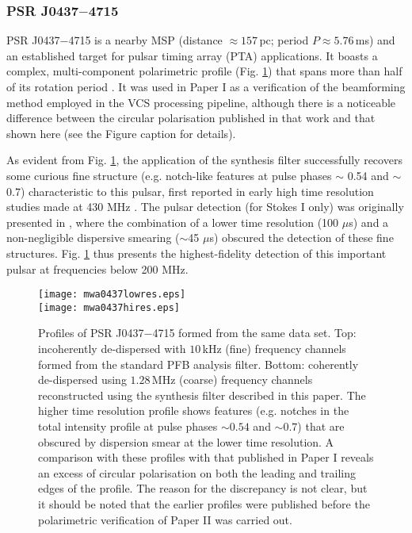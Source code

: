 \documentclass{pasa}%
\newcommand{\psrbhatJ}{J0437$-$4715}
\begin{document}
\subsubsection{PSR \psrbhatJ{}}

PSR \psrbhatJ{} is a nearby MSP (distance $\approx 157\,$pc; period $P \approx 5.76\,$ms) and an established target for pulsar timing array (PTA) applications.
It boasts a complex, multi-component polarimetric profile (Fig. \ref{fig:0437}) that spans more than half of its rotation period \citep[cf.][]{Yan2011}.
It was used in Paper I as a verification of the beamforming method employed in the VCS processing pipeline, although there is a noticeable difference between the circular polarisation published in that work and that shown here (see the Figure caption for details).

As evident from Fig. \ref{fig:0437}, the application of the synthesis filter successfully recovers some curious fine structure (e.g. notch-like features at pulse phases $\sim$ 0.54 and $\sim$ 0.7) characteristic to this pulsar, first reported in early high time resolution studies made at 430 MHz \citep{Navarro1997}. The pulsar detection (for Stokes I only) was originally presented in \citet{Bhat2018}, where the combination of a lower time resolution (100 $\mu$s) and a non-negligible dispersive smearing ($\sim$45 $\mu$s) obscured the detection of these fine structures. Fig. \ref{fig:0437} thus presents the highest-fidelity detection of this important pulsar at frequencies below 200 MHz.

\begin{figure}[t!]
    \centering
    \texttt{[image: mwa0437lowres.eps]} \\[10pt]
    \texttt{[image: mwa0437hires.eps]}
    \caption{Profiles of PSR \psrbhatJ{} formed from the same data set. Top: incoherently de-dispersed with $10\,$kHz (fine) frequency channels formed from the standard PFB analysis filter. Bottom: coherently de-dispersed using $1.28\,$MHz (coarse) frequency channels reconstructed using the synthesis filter described in this paper. The higher time resolution profile shows features (e.g. notches in the total intensity profile at pulse phases $\sim 0.54$ and $\sim 0.7$) that are obscured by dispersion smear at the lower time resolution. A comparison with these profiles with that published in Paper I reveals an excess of circular polarisation on both the leading and trailing edges of the profile. The reason for the discrepancy is not clear, but it should be noted that the earlier profiles were published before the polarimetric verification of Paper II was carried out.}
    \label{fig:0437}
\end{figure}
\end{document}
